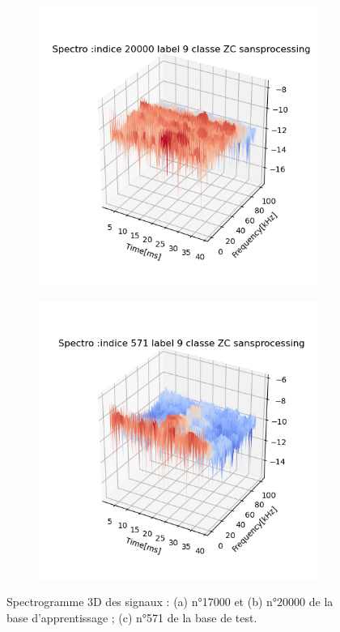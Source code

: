 \begin{figure}[!h]
\begin{subfigure}[l]{0.5\textwidth}
    \includegraphics[width=\textwidth]{./images/indice20000Spectro3Dlabel9classeZCsansprocessingsanszoom.png}
        \caption{}
  \end{subfigure}
  \newline
  \begin{subfigure}[l]{0.5\textwidth}
    \includegraphics[width=\textwidth]{./images/indice571Spectro3Dlabel9classeZCsansprocessingsanszoom.png}
        \caption{}
  \end{subfigure}
  \newline
  \caption{Spectrogramme 3D des signaux : (a) n°17000 et (b) n°20000 de la base d'apprentissage ; (c) n°571 de la base de test.%
  \label{fig:spectros3D}}
\end{figure}



